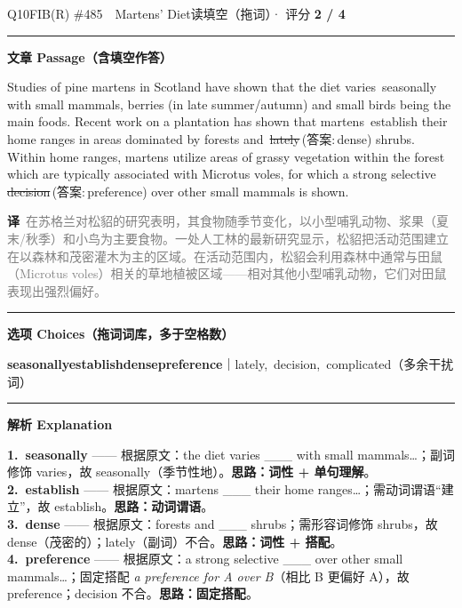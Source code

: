 \documentclass[11pt]{article}
\newcommand{\ptesub}[1]{%
  \par\needspace{2\baselineskip}\smallskip
  {\color{cAccent}\rule[-0.2ex]{3pt}{1.05em}}\hspace{6pt}%
  {\bfseries\color{cHead}#1}\par\nopagebreak\smallskip}
\newcommand{\zh}[1]{{\footnotesize\textcolor{cNote}{\textbf{译}}\ \textcolor{gray}{#1}}}
\newcommand{\rok}[1]{{\color{cFix}\ding{51}\,#1}}                 %
\newcommand{\rno}[2]{{\color{cWrong}\ding{55}\,\sout{#1}}\,{\footnotesize\color{cFix}(答案:\,#2)}}  %
\begin{document}
\begin{qblock}{Q10\quad FIB(R) \#485\ \ Martens' Diet}{读填空（拖词）· 评分 \textcolor{cAccent}{\bfseries 2 / 4}}
\ptesub{文章 Passage（含填空作答）}
\begin{promptbox}
Studies of pine martens in Scotland have shown that the diet varies \rok{seasonally} with small mammals, berries (in late summer/autumn) and small birds being the main foods. Recent work on a plantation has shown that martens \rok{establish} their home ranges in areas dominated by forests and \rno{lately}{dense} shrubs. Within home ranges, martens utilize areas of grassy vegetation within the forest which are typically associated with Microtus voles, for which a strong selective \rno{decision}{preference} over other small mammals is shown.
\end{promptbox}
\zh{在苏格兰对松貂的研究表明，其食物随季节变化，以小型哺乳动物、浆果（夏末/秋季）和小鸟为主要食物。一处人工林的最新研究显示，松貂把活动范围建立在以森林和茂密灌木为主的区域。在活动范围内，松貂会利用森林中通常与田鼠（Microtus voles）相关的草地植被区域——相对其他小型哺乳动物，它们对田鼠表现出强烈偏好。}
\ptesub{选项 Choices（拖词词库，多于空格数）}
{\small \textbf{seasonally}\quad \textbf{establish}\quad \textbf{dense}\quad \textbf{preference}\quad ｜\quad lately,\ decision,\ complicated（多余干扰词）}
\ptesub{解析 Explanation}
\begin{notebox}\footnotesize
\textbf{1.\ seasonally} —— 根据原文：the diet varies \_\_\_ with small mammals…；副词修饰 varies，故 seasonally（季节性地）。\textbf{思路：词性 + 单句理解}。\\[2pt]
\textbf{2.\ establish} —— 根据原文：martens \_\_\_ their home ranges…；需动词谓语“建立”，故 establish。\textbf{思路：动词谓语}。\\[2pt]
\textbf{3.\ dense} —— 根据原文：forests and \_\_\_ shrubs；需形容词修饰 shrubs，故 dense（茂密的）；lately（副词）不合。\textbf{思路：词性 + 搭配}。\\[2pt]
\textbf{4.\ preference} —— 根据原文：a strong selective \_\_\_ over other small mammals…；固定搭配 \emph{a preference for A over B}（相比 B 更偏好 A），故 preference；decision 不合。\textbf{思路：固定搭配}。
\end{notebox}
\end{qblock}
\end{document}
